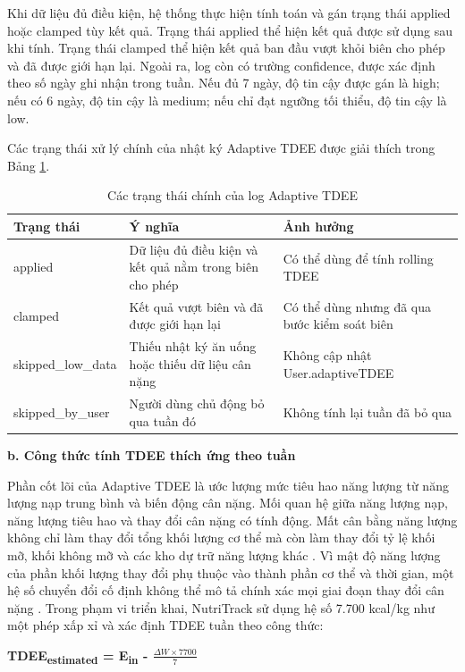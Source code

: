 \documentclass[12pt, a4paper]{report}
\begin{document}
Khi dữ liệu đủ điều kiện, hệ thống thực hiện tính toán và gán trạng thái applied hoặc clamped tùy kết quả. Trạng thái applied thể hiện kết quả được sử dụng sau khi tính. Trạng thái clamped thể hiện kết quả ban đầu vượt khỏi biên cho phép và đã được giới hạn lại. Ngoài ra, log còn có trường confidence, được xác định theo số ngày ghi nhận trong tuần. Nếu đủ 7 ngày, độ tin cậy được gán là high; nếu có 6 ngày, độ tin cậy là medium; nếu chỉ đạt ngưỡng tối thiểu, độ tin cậy là low.

\enlargethispage{4\baselineskip}
Các trạng thái xử lý chính của nhật ký Adaptive TDEE được giải thích trong Bảng \ref{tab:adaptive_tdee_status}.
\begin{longtable}{|>{\raggedright\arraybackslash}p{4cm}|>{\raggedright\arraybackslash}p{4cm}|p{7cm}|}
\caption{Các trạng thái chính của log Adaptive TDEE}
\label{tab:adaptive_tdee_status} \\
\hline
\textbf{Trạng thái} & \textbf{Ý nghĩa} & \textbf{Ảnh hưởng} \\
\hline
applied & Dữ liệu đủ điều kiện và kết quả nằm trong biên cho phép & Có thể dùng để tính rolling TDEE \\
\hline
clamped & Kết quả vượt biên và đã được giới hạn lại & Có thể dùng nhưng đã qua bước kiểm soát biên \\
\hline
skipped\_low\_data & Thiếu nhật ký ăn uống hoặc thiếu dữ liệu cân nặng & Không cập nhật User.adaptiveTDEE \\
\hline
skipped\_by\_user & Người dùng chủ động bỏ qua tuần đó & Không tính lại tuần đã bỏ qua \\
\hline
\end{longtable}

\textbf{b. Công thức tính TDEE thích ứng theo tuần}

Phần cốt lõi của Adaptive TDEE là ước lượng mức tiêu hao năng lượng từ năng lượng nạp trung bình và biến động cân nặng. Mối quan hệ giữa năng lượng nạp, năng lượng tiêu hao và thay đổi cân nặng có tính động. Mất cân bằng năng lượng không chỉ làm thay đổi tổng khối lượng cơ thể mà còn làm thay đổi tỷ lệ khối mỡ, khối không mỡ và các kho dự trữ năng lượng khác \cite{chow_hall_2008}. Vì mật độ năng lượng của phần khối lượng thay đổi phụ thuộc vào thành phần cơ thể và thời gian, một hệ số chuyển đổi cố định không thể mô tả chính xác mọi giai đoạn thay đổi cân nặng \cite{chow_hall_2008}. Trong phạm vi triển khai, NutriTrack sử dụng hệ số 7.700 kcal/kg như một phép xấp xỉ và xác định TDEE tuần theo công thức:

\textbf{TDEE\textsubscript{estimated} = E\textsubscript{in} - $\frac{\Delta W \times 7700}{7}$}
\end{document}
